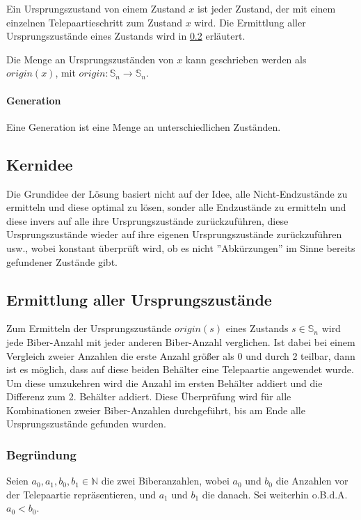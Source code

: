 \documentclass[a4paper,10pt,ngerman]{scrartcl}
\begin{document}
Ein Ursprungszustand von einem Zustand \(x\) ist jeder Zustand, der mit einem einzelnen Telepaartieschritt zum Zustand \(x\) wird. Die Ermittlung aller Ursprungszustände eines Zustands wird in \cref{alg:origin} erläutert.

Die Menge an Ursprungszuständen von \(x\) kann geschrieben werden als \(origin(x)\), mit \(origin : \mathbb{S}_n \to \mathbb{S}_n \).

\paragraph{Generation} \label{def:generation}

Eine Generation ist eine Menge an unterschiedlichen Zuständen.

\subsection{Kernidee}

Die Grundidee der Lösung basiert nicht auf der Idee, alle Nicht-Endzustände zu ermitteln und diese optimal zu lösen, sonder alle Endzustände zu ermitteln und diese invers auf alle ihre Ursprungszustände zurückzuführen, diese Ursprungszustände wieder auf ihre eigenen Ursprungszustände zurückzuführen usw., wobei konstant überprüft wird, ob es nicht ''Abkürzungen'' im Sinne bereits gefundener Zustände gibt.

\subsection{Ermittlung aller Ursprungszustände} \label{alg:origin}

Zum Ermitteln der Ursprungszustände \(origin(s)\) eines Zustands \(s \in \mathbb{S}_n\) wird jede Biber-Anzahl mit jeder anderen Biber-Anzahl verglichen. Ist dabei bei einem Vergleich zweier Anzahlen die erste Anzahl größer als 0 und durch 2 teilbar, dann ist es möglich, dass auf diese beiden Behälter eine Telepaartie angewendet wurde. Um diese umzukehren wird die Anzahl im ersten Behälter addiert und die Differenz zum 2. Behälter addiert.
Diese Überprüfung wird für alle Kombinationen zweier Biber-Anzahlen durchgeführt, bis am Ende alle Ursprungszustände gefunden wurden.

\subsubsection{Begründung}

Seien \(a_0, a_1, b_0, b_1 \in \mathbb{N}\) die zwei Biberanzahlen, wobei \(a_0\) und \(b_0\) die Anzahlen vor der Telepaartie repräsentieren, und \(a_1\) und \(b_1\) die danach. Sei weiterhin o.B.d.A. \(a_0 < b_0\).
\end{document}
